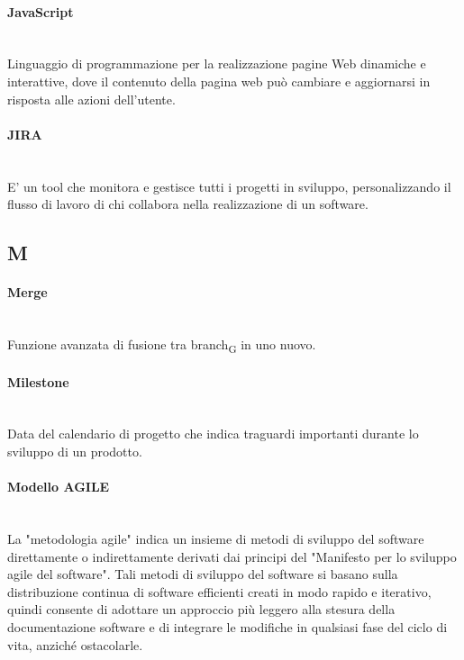 \paragraph{JavaScript}~\smallskip \\
Linguaggio di programmazione per la realizzazione pagine Web dinamiche e interattive, dove il contenuto della pagina web può cambiare e aggiornarsi in risposta alle azioni dell'utente.

\paragraph{JIRA}~\smallskip \\
E' un tool che monitora e gestisce tutti i progetti in sviluppo, personalizzando il flusso di lavoro di chi collabora nella realizzazione di un software.

\newpage
{}
\subsection*{M}

\paragraph{Merge}~\smallskip \\
Funzione avanzata di fusione tra branch\textsubscript{G} in uno nuovo.

\paragraph{Milestone}~\smallskip \\
Data del calendario di progetto che indica traguardi importanti durante lo sviluppo di un prodotto.

\paragraph{Modello AGILE}~\smallskip \\
La "metodologia agile" indica un insieme di metodi di sviluppo del software direttamente o indirettamente derivati dai principi del "Manifesto per lo sviluppo agile del software".
Tali metodi di sviluppo del software si basano sulla distribuzione continua di software efficienti creati in modo rapido e iterativo, quindi
consente di adottare un approccio più leggero alla stesura della documentazione software e di integrare le modifiche in qualsiasi fase del ciclo di vita, anziché ostacolarle.

